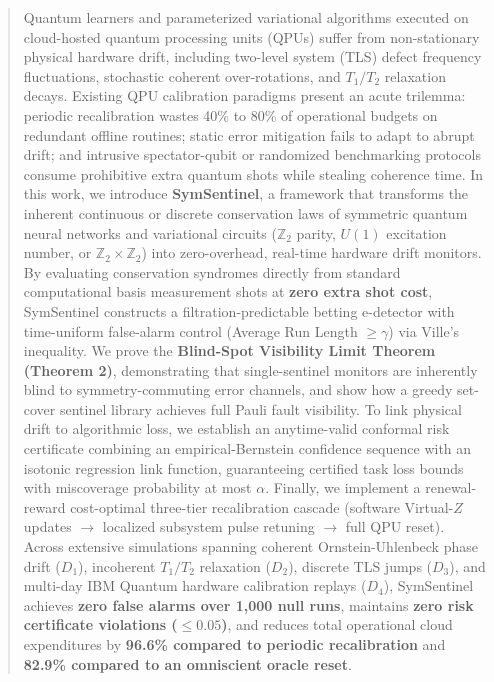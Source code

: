 \documentclass[aps,pra,twocolumn,superscriptaddress,10pt,floatfix]{revtex4-2}
\begin{document}
\begin{abstract}
Quantum learners and parameterized variational algorithms executed on cloud-hosted quantum processing units (QPUs) suffer from non-stationary physical hardware drift, including two-level system (TLS) defect frequency fluctuations, stochastic coherent over-rotations, and $T_1/T_2$ relaxation decays. Existing QPU calibration paradigms present an acute trilemma: periodic recalibration wastes 40\% to 80\% of operational budgets on redundant offline routines; static error mitigation fails to adapt to abrupt drift; and intrusive spectator-qubit or randomized benchmarking protocols consume prohibitive extra quantum shots while stealing coherence time. In this work, we introduce \textbf{SymSentinel}, a framework that transforms the inherent continuous or discrete conservation laws of symmetric quantum neural networks and variational circuits ($\mathbb{Z}_2$ parity, $U(1)$ excitation number, or $\mathbb{Z}_2 \times \mathbb{Z}_2$) into zero-overhead, real-time hardware drift monitors. By evaluating conservation syndromes directly from standard computational basis measurement shots at \textbf{zero extra shot cost}, SymSentinel constructs a filtration-predictable betting e-detector with time-uniform false-alarm control (Average Run Length $\ge \gamma$) via Ville's inequality. We prove the \textbf{Blind-Spot Visibility Limit Theorem (Theorem 2)}, demonstrating that single-sentinel monitors are inherently blind to symmetry-commuting error channels, and show how a greedy set-cover sentinel library achieves full Pauli fault visibility. To link physical drift to algorithmic loss, we establish an anytime-valid conformal risk certificate combining an empirical-Bernstein confidence sequence with an isotonic regression link function, guaranteeing certified task loss bounds with miscoverage probability at most $\alpha$. Finally, we implement a renewal-reward cost-optimal three-tier recalibration cascade (software Virtual-$Z$ updates $\to$ localized subsystem pulse retuning $\to$ full QPU reset). Across extensive simulations spanning coherent Ornstein-Uhlenbeck phase drift ($D_1$), incoherent $T_1/T_2$ relaxation ($D_2$), discrete TLS jumps ($D_3$), and multi-day IBM Quantum hardware calibration replays ($D_4$), SymSentinel achieves \textbf{zero false alarms over 1,000 null runs}, maintains \textbf{zero risk certificate violations ($\le 0.05$)}, and reduces total operational cloud expenditures by \textbf{96.6\% compared to periodic recalibration} and \textbf{82.9\% compared to an omniscient oracle reset}.
\end{abstract}
\end{document}
